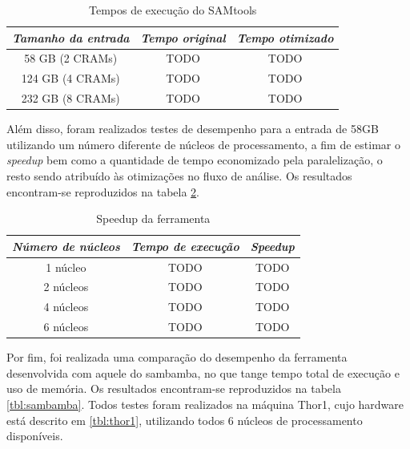 \documentclass[cic,tc]{iiufrgs}
\begin{document}
\begin{table}[h]
    \caption{Tempos de execução do SAMtools}
    \centering
        \begin{tabular}{c|c|c}
          \hline
          \textit{Tamanho da entrada}  &   \textit{Tempo original}  & \textit{Tempo otimizado} \\
          \hline
          \hline
          58 GB (2 CRAMs) & TODO & TODO \\
          124 GB (4 CRAMs) & TODO & TODO \\
          232 GB (8 CRAMs) & TODO & TODO \\
          \hline
        \end{tabular}
    \label{tbl:SAMtools}
\end{table}

Além disso, foram realizados testes de desempenho para a entrada de 58GB
utilizando um número diferente de núcleos de processamento, a fim de estimar o
\textit{speedup} bem como a quantidade de tempo economizado pela paralelização,
o resto sendo atribuído às otimizações no fluxo de análise. Os resultados
encontram-se reproduzidos na tabela \ref{tbl:speedup}.

\begin{table}[h]
    \caption{Speedup da ferramenta}
    \centering
        \begin{tabular}{c|c|c}
          \hline
          \textit{Número de núcleos}  &   \textit{Tempo de execução}  & \textit{Speedup} \\
          \hline
          \hline
          1 núcleo & TODO & TODO \\
          2 núcleos & TODO & TODO \\
          4 núcleos & TODO & TODO \\
          6 núcleos & TODO & TODO \\
          \hline
        \end{tabular}
    \label{tbl:speedup}
\end{table}

Por fim, foi realizada uma comparação do desempenho da ferramenta desenvolvida
com aquele do sambamba, no que tange tempo total de execução e uso de memória.
Os resultados encontram-se reproduzidos na tabela \ref{tbl:sambamba}. Todos
testes foram realizados na máquina Thor1, cujo hardware está descrito em
\ref{tbl:thor1}, utilizando todos 6 núcleos de processamento disponíveis.
\end{document}
